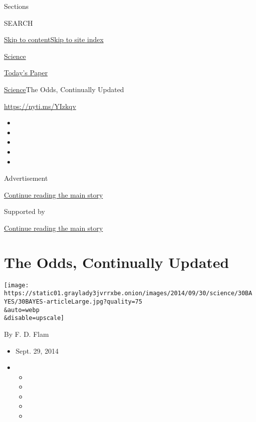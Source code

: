 Sections

SEARCH

\protect\hyperlink{site-content}{Skip to
content}\protect\hyperlink{site-index}{Skip to site index}

\href{https://www.nytimes3xbfgragh.onion/section/science}{Science}

\href{https://myaccount.nytimes3xbfgragh.onion/auth/login?response_type=cookie\&client_id=vi}{}

\href{https://www.nytimes3xbfgragh.onion/section/todayspaper}{Today's
Paper}

\href{/section/science}{Science}\textbar{}The Odds, Continually Updated

\url{https://nyti.ms/YIzkqv}

\begin{itemize}
\item
\item
\item
\item
\item
\end{itemize}

Advertisement

\protect\hyperlink{after-top}{Continue reading the main story}

Supported by

\protect\hyperlink{after-sponsor}{Continue reading the main story}

\hypertarget{the-odds-continually-updated}{%
\section{The Odds, Continually
Updated}\label{the-odds-continually-updated}}

\texttt{[image: https://static01.graylady3jvrrxbe.onion/images/2014/09/30/science/30BAYES/30BAYES-articleLarge.jpg?quality=75\\\&auto=webp\\\&disable=upscale]}

By F. D. Flam

\begin{itemize}
\item
  Sept. 29, 2014
\item
  \begin{itemize}
  \item
  \item
  \item
  \item
  \item
  \end{itemize}
\end{itemize}

